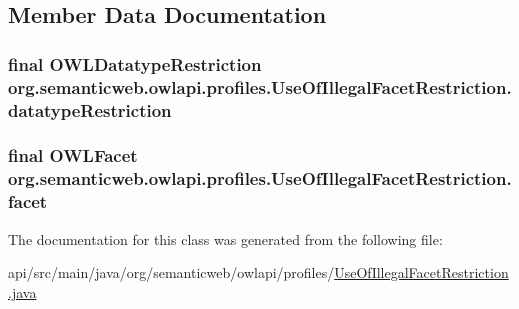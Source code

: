 \subsection{Member Data Documentation}
\hypertarget{classorg_1_1semanticweb_1_1owlapi_1_1profiles_1_1_use_of_illegal_facet_restriction_a73d0e0d2447892d8e9cb5808e4871e1e}{
\subsubsection[{datatype\-Restriction}]{\setlength{\rightskip}{0pt plus 5cm}final {\bf O\-W\-L\-Datatype\-Restriction} org.\-semanticweb.\-owlapi.\-profiles.\-Use\-Of\-Illegal\-Facet\-Restriction.\-datatype\-Restriction\hspace{0.3cm}{\ttfamily [private]}}}\label{classorg_1_1semanticweb_1_1owlapi_1_1profiles_1_1_use_of_illegal_facet_restriction_a73d0e0d2447892d8e9cb5808e4871e1e}
\hypertarget{classorg_1_1semanticweb_1_1owlapi_1_1profiles_1_1_use_of_illegal_facet_restriction_a9813498f51983c5596ea178f74de98e2}{
\subsubsection[{facet}]{\setlength{\rightskip}{0pt plus 5cm}final {\bf O\-W\-L\-Facet} org.\-semanticweb.\-owlapi.\-profiles.\-Use\-Of\-Illegal\-Facet\-Restriction.\-facet\hspace{0.3cm}{\ttfamily [private]}}}\label{classorg_1_1semanticweb_1_1owlapi_1_1profiles_1_1_use_of_illegal_facet_restriction_a9813498f51983c5596ea178f74de98e2}


The documentation for this class was generated from the following file\-:\begin{DoxyCompactItemize}
\item 
api/src/main/java/org/semanticweb/owlapi/profiles/\hyperlink{_use_of_illegal_facet_restriction_8java}{Use\-Of\-Illegal\-Facet\-Restriction.\-java}\end{DoxyCompactItemize}
